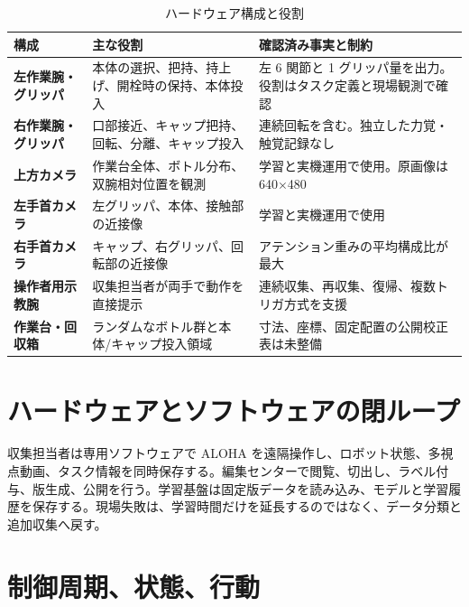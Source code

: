 \begin{table}[H]
\centering
\small
\caption{ハードウェア構成と役割}
\begin{tabularx}{\textwidth}{>{\japanesesans\bfseries}p{28mm}p{44mm}X}
\toprule
構成 & 主な役割 & 確認済み事実と制約\\
\midrule
左作業腕・グリッパ & 本体の選択、把持、持上げ、開栓時の保持、本体投入 & 左 6 関節と 1 グリッパ量を出力。役割はタスク定義と現場観測で確認\\
右作業腕・グリッパ & 口部接近、キャップ把持、回転、分離、キャップ投入 & 連続回転を含む。独立した力覚・触覚記録なし\\
上方カメラ & 作業台全体、ボトル分布、双腕相対位置を観測 & 学習と実機運用で使用。原画像は 640$\times$480\\
左手首カメラ & 左グリッパ、本体、接触部の近接像 & 学習と実機運用で使用\\
右手首カメラ & キャップ、右グリッパ、回転部の近接像 & アテンション重みの平均構成比が最大\\
操作者用示教腕 & 収集担当者が両手で動作を直接提示 & 連続収集、再収集、復帰、複数トリガ方式を支援\\
作業台・回収箱 & ランダムなボトル群と本体/キャップ投入領域 & 寸法、座標、固定配置の公開校正表は未整備\\
\bottomrule
\end{tabularx}
\end{table}

\section{ハードウェアとソフトウェアの閉ループ}


収集担当者は専用ソフトウェアで ALOHA を遠隔操作し、ロボット状態、多視点動画、タスク情報を同時保存する。編集センターで閲覧、切出し、ラベル付与、版生成、公開を行う。学習基盤は固定版データを読み込み、モデルと学習履歴を保存する。現場失敗は、学習時間だけを延長するのではなく、データ分類と追加収集へ戻す。

\section{制御周期、状態、行動}


